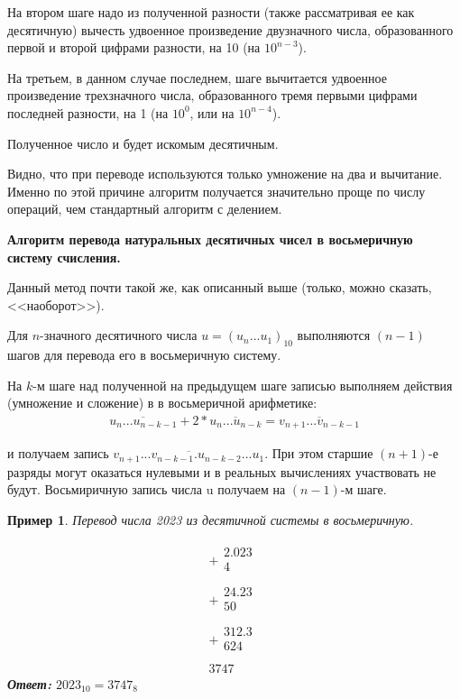 \documentclass[14pt, russian]{scrartcl}
\newcounter{cExample}
\newtheorem{Example}{Пример}[cExample]
\begin{document}
На втором шаге надо из полученной разности (также рассматривая ее как десятичную) вычесть удвоенное произведение двузначного числа, образованного первой и второй цифрами разности, на 10 (на $10^{n-3}$).

На третьем, в данном случае последнем, шаге вычитается удвоенное произведение трехзначного числа, образованного тремя первыми цифрами последней разности, на 1 (на $10^0$, или на $10^{n-4}$).

Полученное число и будет искомым десятичным.

Видно, что при переводе используются только умножение на два и вычитание. Именно по этой причине алгоритм получается значительно проще по числу операций, чем стандартный алгоритм с делением.

\vspace{1em}
\textbf{Алгоритм перевода натуральных десятичных чисел в восьмеричную систему счисления.}

Данный метод почти такой же, как описанный выше (только,
можно сказать, <<наоборот>>).

Для $n$-значного десятичного числа $u = (u_n...u_1)_{10}$ выполняются $(n - 1)$ шагов для перевода его в восьмеричную систему.

На $k$-м шаге над полученной на предыдущем шаге записью выполняем действия (умножение и сложение) в в восьмеричной арифметике:
\label{Example:MathFont6} 
\begin{equation*}\label{eq:5}
\begin{aligned}
\overline{u_n ... u_{n-k-1}} + 2 * \overline{u_n ... u_{n-k}} = \overline{v_{n+1} ... v_{n-k-1}}
\end{aligned}
\end{equation*} 

\noindent 
и получаем запись $\overline{v_{n+1} ... v_{n-k-1}.u_{n-k-2} ... u_1}$. При этом старшие $(n + 1)$-е разряды могут оказаться нулевыми и в реальных вычислениях участвовать не будут. Восьмиричную запись числа u получаем на $(n - 1)$-м шаге.

\begin{Example}\label{Example:MathFont7}
Перевод числа 2023 из десятичной системы в восьмеричную. 

$$
\begin{array}{r}
+
\begin{array}{r}
2.023\\
4\quad\quad\\
\end{array} \\
\hline
+
\begin{array}{r}
24.23\\
50\,\,\,\,\\
\end{array} \\
\hline
+
\begin{array}{r}
312.3\\
624\\
\end{array} \\
\hline
3747\,\,\,
\end{array}
$$
\textbf{Ответ:} $2023_{10} = 3747_8$ 
\end{Example} 
\end{document}
